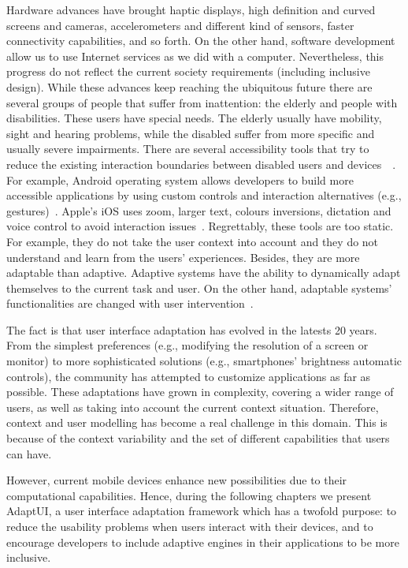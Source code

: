 Hardware advances have brought haptic displays, high definition and curved 
screens and cameras, accelerometers and different kind of sensors, faster 
connectivity capabilities, and so forth. On the other hand, software development
allow us to use Internet services as we did with a computer. Nevertheless,
this progress do not reflect the current society requirements (including
inclusive design). While these advances keep reaching the ubiquitous future
there are several groups of people that suffer from inattention: the elderly and
people with disabilities. These users have special needs. The elderly usually
have mobility, sight and hearing problems, while the disabled suffer from more
specific and usually severe impairments. There are several accessibility tools
that try to reduce the existing interaction boundaries between disabled users
and devices~\citep{gregor_designing_2002}~\citep{burgstahler_designing_2002}.
For example, Android operating system allows developers to build more accessible 
applications by using custom controls and interaction alternatives (e.g.,
gestures)~\citep{android_accessibility}. Apple's iOS uses zoom, larger text,
colours inversions, dictation and voice control to avoid interaction
issues~\citep{ios_accessibility}. Regrettably, these tools are too static. For
example, they do not take the user context into account and they do not understand
and learn from the users' experiences. Besides, they are more adaptable than 
adaptive. Adaptive systems have the ability to dynamically adapt themselves to 
the current task and user. On the other hand, adaptable systems' functionalities 
are changed with user intervention~\citep{fischer_user_2001}.

The fact is that user interface adaptation has evolved in the latests 20 years.
From the simplest preferences (e.g., modifying the resolution of a screen or
monitor) to more sophisticated solutions (e.g., smartphones' brightness automatic
controls), the community has attempted to customize applications as far as 
possible. These adaptations have grown in complexity, covering a wider range of 
users, as well as taking into account the current context situation. Therefore, 
context and user modelling has become a real challenge in this domain. This is 
because of the context variability and the set of different capabilities that 
users can have.

However, current mobile devices enhance new possibilities due to their 
computational capabilities. Hence, during the following chapters we present 
AdaptUI, a user interface adaptation framework which has a twofold purpose: to 
reduce the usability problems when users interact with their devices, and to 
encourage developers to include adaptive engines in their applications to be 
more inclusive.



